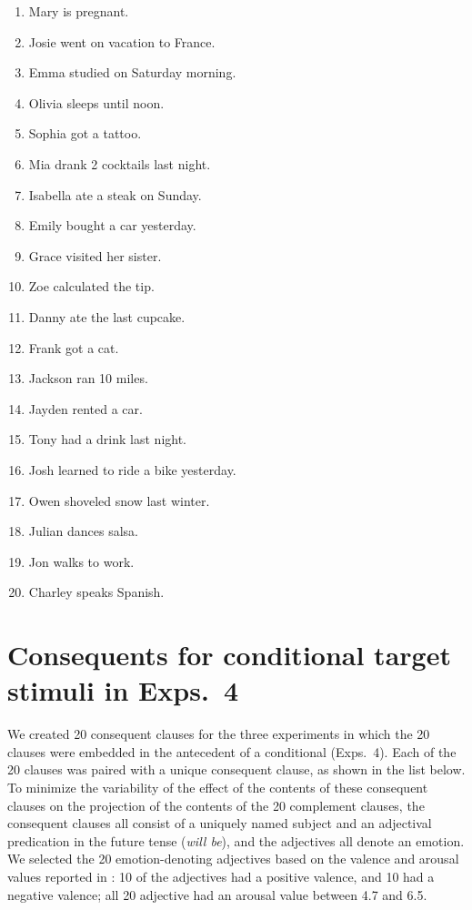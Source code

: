 \documentclass[a4paper,12pt,twoside]{article}
\begin{document}
    \begin{enumerate}%
        \item Mary is pregnant.
        \item Josie went on vacation to France.
        \item Emma studied on Saturday morning.
        \item Olivia sleeps until noon.
        \item Sophia got a tattoo.
        \item Mia drank 2 cocktails last night.
        \item Isabella ate a steak on Sunday.
        \item  Emily bought a car yesterday.
        \item  Grace visited her sister.
        \item Zoe calculated the tip.

        
        \item  Danny ate the last cupcake.
        \item  Frank got a cat.
        \item  Jackson ran 10 miles.
        \item  Jayden rented a car.
        \item  Tony had a drink last night.
        \item  Josh learned to ride a bike yesterday.
        \item  Owen shoveled snow last winter.
        \item  Julian dances salsa.
        \item  Jon walks to work.
        \item  Charley speaks Spanish.
            
    \end{enumerate}

\section{Consequents for conditional target stimuli in Exps.~4} \label{app:b-consequents}
    We created 20 consequent clauses for the three experiments in which the 20 clauses were embedded in the antecedent of a conditional (Exps.~4). Each of the 20 clauses was paired with a unique consequent clause, as shown in the list below. To minimize the variability of the effect of the contents of these consequent clauses on the projection of the contents of the 20 complement clauses, the consequent clauses all consist of a uniquely named subject and an adjectival predication in the future tense ({\em will be}), and the adjectives all denote an emotion. We selected the 20 emotion-denoting adjectives based on the valence and arousal values reported in \citealt{warriner_norms_2013}: 10 of the adjectives had a positive valence, and 10 had a negative valence; all 20 adjective had an arousal value between 4.7 and 6.5. 
    
\end{document}
